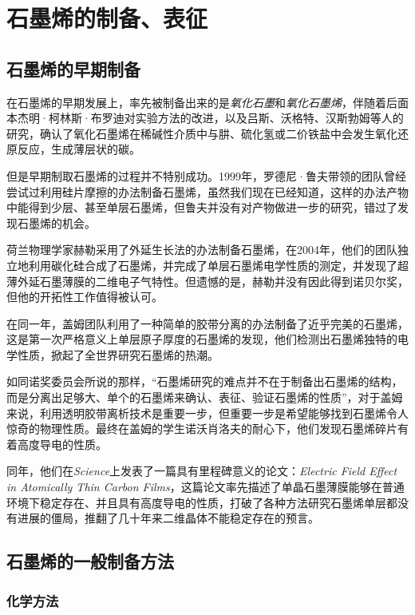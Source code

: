 
\chapter{石墨烯的制备、表征}

\section{石墨烯的早期制备}

在石墨烯的早期发展上，率先被制备出来的是\textit{氧化石墨}和\textit{氧化石墨烯}，伴随着后面本杰明·柯林斯·布罗迪对实验方法的改进，以及吕斯、沃格特、汉斯勃姆等人的研究，确认了氧化石墨烯在稀碱性介质中与肼、硫化氢或二价铁盐中会发生氧化还原反应，生成薄层状的碳。

但是早期制取石墨烯的过程并不特别成功。1999年，罗德尼·鲁夫带领的团队曾经尝试过利用硅片摩擦的办法制备石墨烯，虽然我们现在已经知道，这样的办法产物中能得到少层、甚至单层石墨烯，但鲁夫并没有对产物做进一步的研究，错过了发现石墨烯的机会。

荷兰物理学家赫勒采用了外延生长法的办法制备石墨烯，在2004年，他们的团队独立地利用碳化硅合成了石墨烯，并完成了单层石墨烯电学性质的测定，并发现了超薄外延石墨薄膜的二维电子气特性。但遗憾的是，赫勒并没有因此得到诺贝尔奖，但他的开拓性工作值得被认可。

在同一年，盖姆团队利用了一种简单的胶带分离的办法制备了近乎完美的石墨烯，这是第一次严格意义上单层原子厚度的石墨烯的发现，他们检测出石墨烯独特的电学性质，掀起了全世界研究石墨烯的热潮。

如同诺奖委员会所说的那样，“石墨烯研究的难点并不在于制备出石墨烯的结构，而是分离出足够大、单个的石墨烯来确认、表征、验证石墨烯的性质”，对于盖姆来说，利用透明胶带离析技术是重要一步，但重要一步是希望能够找到石墨烯令人惊奇的物理性质。最终在盖姆的学生诺沃肖洛夫的耐心下，他们发现石墨烯碎片有着高度导电的性质。

同年，他们在\textit{Science}上发表了一篇具有里程碑意义的论文：\textit{Electric Field Effect in Atomically Thin Carbon Films}，这篇论文率先描述了单晶石墨薄膜能够在普通环境下稳定存在、并且具有高度导电的性质，打破了各种方法研究石墨烯单层都没有进展的僵局，推翻了几十年来二维晶体不能稳定存在的预言。

\section{石墨烯的一般制备方法}

\subsection{化学方法}

